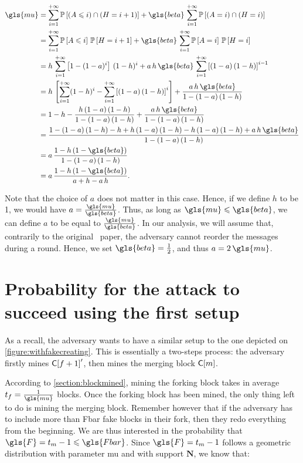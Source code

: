 \begin{align*}
    \gls{mu} &= \sum_{i=1}^{+\infty}\P{(A\leqslant i)\cap(H=i+1)} + \gls{beta}\,\sum_{i=1}^{+\infty}\P{(A=i)\cap(H=i)}\\
    &= \sum_{i=1}^{+\infty}\P{A\leqslant i}\,\P{H=i+1} + \gls{beta}\,\sum_{i=1}^{+\infty}\P{A=i}\,\P{H=i}\\
    &= h\,\sum_{i=1}^{+\infty}\left[1-(1-a)^i\right]\,(1-h)^i + a\,h\,\gls{beta}\,\sum_{i=1}^{+\infty}\left[(1-a)\,(1-h)\right]^{i-1}\\
    &= h\,\left[\sum_{i=1}^{+\infty}(1-h)^i-\sum_{i=1}^{+\infty}\left[(1-a)\,(1-h)\right]^i\right] + \frac{a\,h\,\gls{beta}}{1-(1-a)\,(1-h)}\\
    &= 1 - h - \frac{h\,(1-a)\,(1-h)}{1-(1-a)\,(1-h)} + \frac{a\,h\,\gls{beta}}{1-(1-a)\,(1-h)}\\
    &= \frac{1-(1-a)\,(1-h)-h+h\,(1-a)\,(1-h)-h\,(1-a)\,(1-h)+a\,h\,\gls{beta}}{1-(1-a)\,(1-h)}\\
    &= a\,\frac{1-h\,(1-\gls{beta})}{1-(1-a)\,(1-h)}\\
    &= a\,\frac{1-h\,(1-\gls{beta})}{a+h-a\,h}.
\end{align*}

Note that the choice of \(a\) does not matter in this case. Hence, if we define \(h\) to be 1, we would have \(a=\frac{\gls{mu}}{\gls{beta}}\). Thus, as long as \(\gls{mu}\leqslant\gls{beta}\), we can define \(a\) to be equal to \(\frac{\gls{mu}}{\gls{beta}}\). In our analysis, we will assume that, contrarily to the original \FC\ paper, the adversary cannot reorder the messages during a round. Hence, we set \(\gls{beta}=\frac12\), and thus \(a=2\,\gls{mu}\).

\section{Probability for the attack to succeed using the first setup}
\label{section:firstsetup}
    As a recall, the adversary wants to have a similar setup to the one depicted on \autoref{figure:withfakecreating}. This is essentially a two-steps process: the adversary firstly mines \(\mathsf{C[}f+1\mathsf{]}'\), then mines the merging block \(\mathsf{C[}m\mathsf{]}\). 
    
    According to \autoref{section:blockmined}, mining the forking block takes in average \(t_f=\frac{1}{\gls{mu}}\) blocks. Once the forking block has been mined, the only thing left to do is mining the merging block. Remember however that if the adversary has to include more than \gls{Fbar} fake blocks in their fork, then they redo everything from the beginning. We are thus interested in the probability that \(\gls{F}=t_m-1\leqslant\gls{Fbar}\). Since \(\gls{F}=t_m-1\) follows a geometric distribution with parameter \gls{mu} and with support \(\mathbf{N}\), we know that:
    
